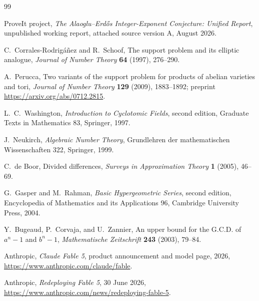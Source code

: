\documentclass[11pt,oneside]{article}
\theoremstyle{definition}
\theoremstyle{remark}
\begin{document}
\begin{thebibliography}{99}

ProveIt project,
\emph{The Alaoglu--Erd\H{o}s Integer-Exponent Conjecture: Unified Report},
unpublished working report, attached source version A, August 2026.

C.~Corrales-Rodrig\'a\~nez and R.~Schoof,
The support problem and its elliptic analogue,
\emph{Journal of Number Theory} \textbf{64} (1997), 276--290.

A.~Perucca,
Two variants of the support problem for products of abelian varieties and tori,
\emph{Journal of Number Theory} \textbf{129} (2009), 1883--1892;
preprint \url{https://arxiv.org/abs/0712.2815}.

L.~C.~Washington,
\emph{Introduction to Cyclotomic Fields}, second edition,
Graduate Texts in Mathematics 83, Springer, 1997.

J.~Neukirch,
\emph{Algebraic Number Theory},
Grundlehren der mathematischen Wissenschaften 322, Springer, 1999.

C.~de Boor,
Divided differences,
\emph{Surveys in Approximation Theory} \textbf{1} (2005), 46--69.

G.~Gasper and M.~Rahman,
\emph{Basic Hypergeometric Series}, second edition,
Encyclopedia of Mathematics and its Applications 96, Cambridge University Press, 2004.

Y.~Bugeaud, P.~Corvaja, and U.~Zannier,
An upper bound for the G.C.D. of $a^n-1$ and $b^n-1$,
\emph{Mathematische Zeitschrift} \textbf{243} (2003), 79--84.

Anthropic,
\emph{Claude Fable 5}, product announcement and model page, 2026,
\url{https://www.anthropic.com/claude/fable}.

Anthropic,
\emph{Redeploying Fable 5}, 30 June 2026,
\url{https://www.anthropic.com/news/redeploying-fable-5}.

\end{thebibliography}
\end{document}
